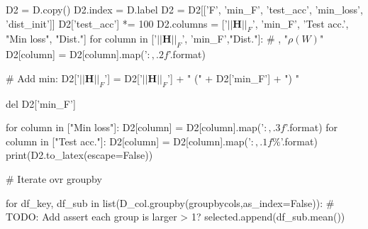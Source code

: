 D2 = D.copy()
D2.index = D.label
D2 = D2[['F', 'min_F', 'test_acc', 'min_loss', 'dist_init']]
D2['test_acc'] *= 100
D2.columns = ['$||\mathbf{H}||_F$', 'min_F', 'Test acc.', "Min loss", "Dist."]
for column in ['$||\mathbf{H}||_F$', 'min_F',"Dist."]: # , "$\rho(W)$"
    D2[column] = D2[column].map('${:,.2f}$'.format)
    
    
# Add min:
D2['$||\mathbf{H}||_F$'] = D2['$||\mathbf{H}||_F$'] + " (" + D2['min_F'] + ") "

del D2['min_F']
    
for column in ["Min loss"]:
    D2[column] = D2[column].map('${:,.3f}$'.format)
for column in ["Test acc."]:
    D2[column] = D2[column].map('${:,.1f}\%$'.format)
print(D2.to_latex(escape=False))

# Iterate ovr groupby

for df_key, df_sub in list(D_col.groupby(groupbycols,as_index=False)):
            # TODO: Add assert each group is larger > 1?
            selected.append(df_sub.mean())